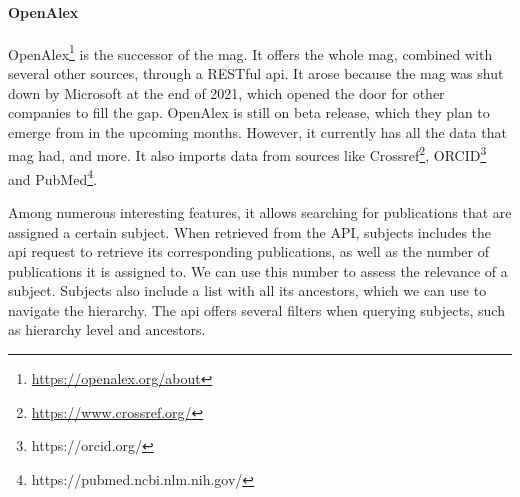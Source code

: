 \paragraph{OpenAlex} \mbox{}

OpenAlex\footnote{\url{https://openalex.org/about}} is the successor of the \acrshort{mag}. It offers the whole \acrshort{mag}, combined with several other sources, through a RESTful \acrshort{api}. It arose because the \acrshort{mag} was shut down by Microsoft at the end of 2021, which opened the door for other companies to fill the gap. OpenAlex is still on beta release, which they plan to emerge from in the upcoming months. However, it currently has all the data that \acrshort{mag} had, and more. It also imports data from sources like Crossref\footnote{\url{https://www.crossref.org/}}, ORCID\footnote{https://orcid.org/} and PubMed\footnote{https://pubmed.ncbi.nlm.nih.gov/}.

Among numerous interesting features, it allows searching for publications that are assigned a certain subject. When retrieved from the API, subjects includes the \acrshort{api} request to retrieve its corresponding publications, as well as the number of publications it is assigned to. We can use this number to assess the relevance of a subject. Subjects also include a list with all its ancestors, which we can use to navigate the hierarchy. The \acrshort{api} offers several filters when querying subjects, such as hierarchy level and ancestors.